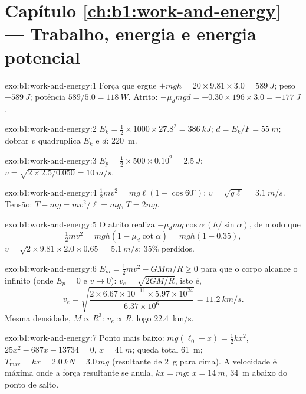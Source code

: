 \section*{Capítulo \ref{ch:b1:work-and-energy} --- Trabalho, energia e energia potencial}

\begin{solution}{exo:b1:work-and-energy:1}
Força que ergue $+mgh = 20 \times 9.81 \times 3.0 = \qty{589}{J}$; peso
$-\qty{589}{J}$; potência $589/5.0 = \qty{118}{W}$. Atrito: $-\mu_dmgd =
-0.30 \times 196 \times 3.0 = \qty{-177}{J}$.
\end{solution}

\begin{solution}{exo:b1:work-and-energy:2}
$E_k = \tfrac12 \times 1000 \times 27.8^2 = \qty{386}{kJ}$; $d = E_k/F =
\qty{55}{m}$; dobrar $v$ quadruplica $E_k$ e $d$: \qty{220}{m}.
\end{solution}

\begin{solution}{exo:b1:work-and-energy:3}
$E_p = \tfrac12 \times 500 \times 0.10^2 = \qty{2.5}{J}$; $v = \sqrt{2 \times
2.5/0.050} = \qty{10}{m/s}$.
\end{solution}

\begin{solution}{exo:b1:work-and-energy:4}
$\tfrac12 mv^2 = mg\ell(1 - \cos 60^\circ)$: $v = \sqrt{g\ell} = \qty{3.1}{m/s}$.
Tensão: $T - mg = mv^2/\ell = mg$, $T = 2mg$.
\end{solution}

\begin{solution}{exo:b1:work-and-energy:5}
O atrito realiza $-\mu_dmg\cos\alpha\,(h/\sin\alpha)$, de modo que
\[
\tfrac12 mv^2 = mgh(1 - \mu_d\cot\alpha) = mgh(1 - 0.35),
\]
$v = \sqrt{2 \times 9.81 \times 2.0 \times 0.65} = \qty{5.1}{m/s}$; $35\%$ perdidos.
\end{solution}

\begin{solution}{exo:b1:work-and-energy:6}
$E_m = \tfrac12 mv^2 - GMm/R \geq 0$ para que o corpo alcance o infinito
(onde $E_p = 0$ e $v \to 0$): $v_e = \sqrt{2GM/R}$, isto é,
\[
v_e = \sqrt{\frac{2 \times 6.67\times10^{-11} \times 5.97\times10^{24}}{6.37\times10^6}}
= \qty{11.2}{km/s}.
\]
Mesma densidade, $M \propto R^3$: $v_e \propto R$, logo \qty{22.4}{km/s}.
\end{solution}

\begin{solution}{exo:b1:work-and-energy:7}
Ponto mais baixo: $mg(\ell_0 + x) = \tfrac12 kx^2$, $25x^2 - 687x - 13734 = 0$,
$x = \qty{41}{m}$; queda total \qty{61}{m}; $T_{\max} = kx = \qty{2.0}{kN}
= 3.0\,mg$ (resultante de \qty{2}{g} para cima). A velocidade é máxima onde a força resultante
se anula, $kx = mg$: $x = \qty{14}{m}$, \qty{34}{m} abaixo do ponto de salto.
\end{solution}

